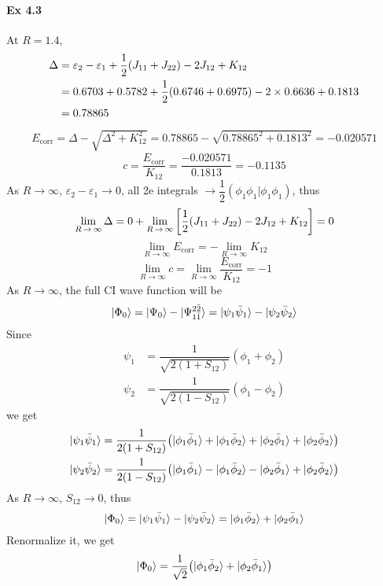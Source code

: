 \documentclass[a4paper]{article}
\DeclareMathOperator{\ra}{\rightarrow}
\DeclareMathOperator{\corr}{\mathrm{corr}}
\newcommand{\ex}[1]{\paragraph{Ex #1}}
\numberwithin{equation}{subsection}
\begin{document}
\ex{4.3}
At $ R = 1.4 $,
\begin{align}
\Delta &= \varepsilon_2 - \varepsilon_1 + \dfrac{1}{2}(J_{11} + J_{22}) - 2J_{12} + K_{12} \notag\\
&= 0.6703 + 0.5782 + \dfrac{1}{2}(0.6746 + 0.6975) - 2\times 0.6636 + 0.1813 \notag\\
&= 0.78865
\end{align}
\begin{align}
E_{\corr} = \Delta - \sqrt{\Delta^2 + K_{12}^2} = 0.78865 - \sqrt{0.78865^2 + 0.1813^2} = -0.020571
\end{align}
\begin{equation}\label{key}
c = \dfrac{E_{\corr}}{K_{12}} = \dfrac{-0.020571}{0.1813} = -0.1135
\end{equation}
As $ R\ra\infty $, $ \varepsilon_2 - \varepsilon_1 \ra 0 $, all 2e integrals $ \ra \dfrac{1}{2}(\phi_1\phi_1|\phi_1\phi_1) $, thus
\begin{align}
\lim\limits_{R\ra\infty}\Delta = 0 + \lim\limits_{R\ra\infty} \qty[\dfrac{1}{2}(J_{11} + J_{22}) - 2J_{12} + K_{12}] = 0
\end{align}
\begin{equation}\label{key}
\lim\limits_{R\ra\infty} E_{\corr} =  -\lim\limits_{R\ra\infty} K_{12}
\end{equation}
\begin{equation}\label{key}
\lim\limits_{R\ra\infty} c = \lim\limits_{R\ra\infty} \dfrac{E_{\corr}}{K_{12}} = -1
\end{equation}
As $ R\ra\infty $, the full CI wave function will be
\begin{equation}\label{key}
\ket{\Phi_0} = \ket{\Psi_0} - \ket{\Psi_{1\bar{1}}^{2\bar{2}}} = \ket{\psi_1\bar\psi_1} - \ket{\psi_2\bar\psi_2}
\end{equation}
Since
\begin{align}
\psi_1 &= \dfrac{1}{\sqrt{2(1 + S_{12})}}(\phi_1 + \phi_2) \\
\psi_2 &= \dfrac{1}{\sqrt{2(1 - S_{12})}}(\phi_1 - \phi_2)
\end{align}
we get
\begin{align}
\ket{\psi_1\bar\psi_1} &= \dfrac{1}{2(1 + S_{12})} \qty(\ket{\phi_1\bar\phi_1} + \ket{\phi_1\bar\phi_2} + \ket{\phi_2\bar\phi_1} + \ket{\phi_2\bar\phi_2}) \\
\ket{\psi_2\bar\psi_2} &= \dfrac{1}{2(1 - S_{12})} \qty(\ket{\phi_1\bar\phi_1} - \ket{\phi_1\bar\phi_2} - \ket{\phi_2\bar\phi_1} + \ket{\phi_2\bar\phi_2})
\end{align}
As $ R\ra\infty $, $ S_{12}\ra 0 $, thus
\begin{align}
\ket{\Phi_0} = \ket{\psi_1\bar\psi_1} - \ket{\psi_2\bar\psi_2} = \ket{\phi_1\bar\phi_2} + \ket{\phi_2\bar\phi_1}
\end{align}
Renormalize it, we get
\begin{equation}\label{key}
\ket{\Phi_0} = \dfrac{1}{\sqrt{2}}\qty(\ket{\phi_1\bar\phi_2} + \ket{\phi_2\bar\phi_1})
\end{equation}
\end{document}
